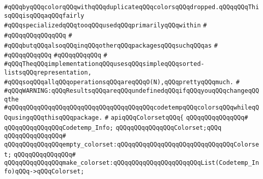 \verb|#qQQqbyqQQqcolorqQQqwithqQQqduplicateqQQqcolorsqQQqdropped.qQQqqQQqThisqQQqisqQQqaqQQqfairly|\newline
\verb|#qQQqspecializedqQQqtooqQQqusedqQQqprimarilyqQQqwithin|\newline
\verb|#|\newline
\verb|#qQQqqQQqqQQqqQQq|\newline
\verb|#|\newline
\verb|#qQQqbutqQQqalsoqQQqinqQQqotherqQQqpackagesqQQqsuchqQQqas|\newline
\verb|#|\newline
\verb|#qQQqqQQqqQQq|\newline
\verb|#qQQqqQQqqQQq|\newline
\verb|#|\newline
\verb|#qQQqTheqQQqimplementationqQQqusesqQQqsimpleqQQqsorted-listsqQQqrepresentation,|\newline
\verb|#qQQqsoqQQqallqQQqoperationsqQQqareqQQqO(N),qQQqprettyqQQqmuch.|\newline
\verb|#|\newline
\verb|#qQQqWARNING:qQQqResultsqQQqareqQQqundefinedqQQqifqQQqyouqQQqchangeqQQqthe|\newline
\verb|#qQQqqQQqqQQqqQQqqQQqqQQqqQQqqQQqqQQqqQQqcodetempqQQqcolorsqQQqwhileqQQqusingqQQqthisqQQqpackage.|\newline
\verb|#|\newline
\verb|apiqQQqColorsetqQQq{|\newline
\verb|qQQqqQQqqQQqqQQq#|\newline
\verb|qQQqqQQqqQQqqQQqCodetemp_Info;|\newline
\verb|qQQqqQQqqQQqqQQqColorset;qQQq|\newline
\verb|qQQqqQQqqQQqqQQq#|\newline
\verb|qQQqqQQqqQQqqQQqempty_colorset:qQQqqQQqqQQqqQQqqQQqqQQqqQQqqQQqColorset;|\newline
\verb|qQQqqQQqqQQqqQQq#|\newline
\verb|qQQqqQQqqQQqqQQqmake_colorset:qQQqqQQqqQQqqQQqqQQqqQQqList(Codetemp_Info)qQQq->qQQqColorset;|\newline
